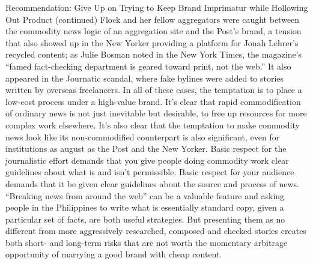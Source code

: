 Recommendation: Give Up on Trying to Keep Brand Imprimatur while
Hollowing Out Product (continued)
Flock and her fellow aggregators were caught between the commodity
news logic of an aggregation site and the Post’s brand, a tension that
also showed up in the New Yorker providing a platform for Jonah Lehrer’s
recycled content; as Julie Bosman noted in the New York Times,
the magazine’s ``famed fact-checking department is geared toward print,
not the web.'' It also appeared in the Journatic scandal, where fake bylines
were added to stories written by overseas freelancers.
In all of these cases, the temptation is to place a low-cost process under a
high-value brand. It’s clear that rapid commodification of ordinary news
is not just inevitable but desirable, to free up resources for more complex
work elsewhere. It’s also clear that the temptation to make commodity
news look like its non-commodified counterpart is also significant, even
for institutions as august as the Post and the New Yorker.
Basic respect for the journalistic effort demands that you give people
doing commodity work clear guidelines about what is and isn’t permissible.
Basic respect for your audience demands that it be given clear
guidelines about the source and process of news.
``Breaking news from around the web'' can be a valuable feature and
asking people in the Philippines to write what is essentially standard
copy, given a particular set of facts, are both useful strategies. But presenting
them as no different from more aggressively researched, composed
and checked stories creates both short- and long-term risks that
are not worth the momentary arbitrage opportunity of marrying a
good brand with cheap content.

